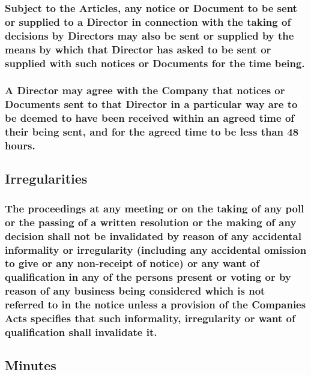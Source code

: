 \documentclass[12pt]{article}
\begin{document}
\subsubsection[Specifics of Communication with Directors]{Subject to the Articles, any notice or Document to be sent or supplied to a Director in connection with the taking of decisions by Directors may also be sent or supplied by the means by which that Director has asked to be sent or supplied with such notices or Documents for the time being.}
\subsubsection[Receipt of Communication with Directors]{A Director may agree with the Company that notices or Documents sent to that Director in a particular way are to be deemed to have been received within an agreed time of their being sent, and for the agreed time to be less than 48 hours.}

\subsection{Irregularities}
\subsubsection[Specifics of Irregularities]{The proceedings at any meeting or on the taking of any poll or the passing of a written resolution or the making of any decision shall not be invalidated by reason of any accidental informality or irregularity (including any accidental omission to give or any non-receipt of notice) or any want of qualification in any of the persons present or voting or by reason of any business being considered which is not referred to in the notice unless a provision of the Companies Acts specifies that such informality, irregularity or want of qualification shall invalidate it.}

\subsection{Minutes}\label{subsection:minutes}
\end{document}
